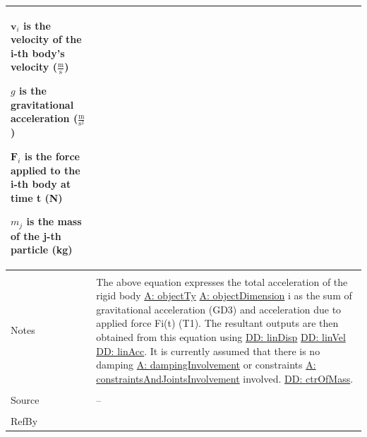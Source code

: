 \documentclass[12pt]{article}
\begin{document}
\begin{minipage}{\textwidth}
\begin{tabular}{p{} p{}}
\begin{symbDescription}
              \item{${\mathbf{v}_{i}}$ is the velocity of the i-th body's velocity ($\frac{\text{m}}{\text{s}}$)}
              \item{$g$ is the gravitational acceleration ($\frac{\text{m}}{\text{s}^{2}}$)}
              \item{${\mathbf{F}_{i}}$ is the force applied to the i-th body at time t (N)}
              \item{${m_{j}}$ is the mass of the j-th particle (kg)}
              \end{symbDescription}
\\ \midrule \\
Notes & The above equation expresses the total acceleration of the rigid body \hyperref[assumpOT]{A: objectTy} \hyperref[assumpOD]{A: objectDimension} i as the sum of gravitational acceleration (GD3) and acceleration due to applied force Fi(t) (T1). The resultant outputs are then obtained from this equation using \hyperref[DD:linDisp]{DD: linDisp} \hyperref[DD:linVel]{DD: linVel} \hyperref[DD:linAcc]{DD: linAcc}.  It is currently assumed that there is no damping \hyperref[assumpDI]{A: dampingInvolvement} or constraints \hyperref[assumpCAJI]{A: constraintsAndJointsInvolvement} involved. \hyperref[DD:ctrOfMass]{DD: ctrOfMass}.
\\ \midrule \\
Source & --
\\ \midrule \\
RefBy & 
\\ \bottomrule \end{tabular}
\end{minipage}
\par~
\end{document}
